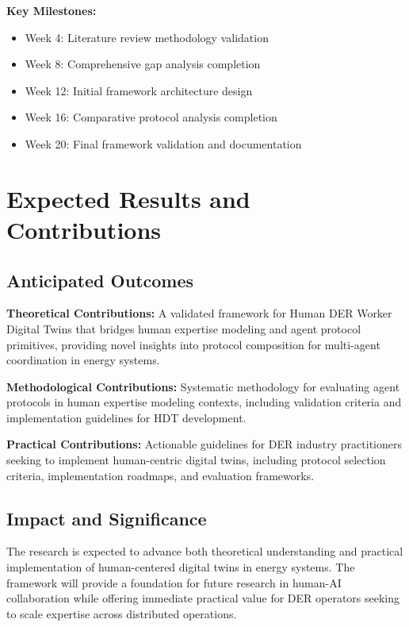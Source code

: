 \documentclass[12pt,a4paper]{article}
\begin{document}
\textbf{Key Milestones:}
\begin{itemize}
\item Week 4: Literature review methodology validation
\item Week 8: Comprehensive gap analysis completion
\item Week 12: Initial framework architecture design
\item Week 16: Comparative protocol analysis completion
\item Week 20: Final framework validation and documentation
\end{itemize}

\section{Expected Results and Contributions}
\label{sec:results}

\subsection{Anticipated Outcomes}

\textbf{Theoretical Contributions:} A validated framework for Human DER Worker Digital Twins that bridges human expertise modeling and agent protocol primitives, providing novel insights into protocol composition for multi-agent coordination in energy systems.

\textbf{Methodological Contributions:} Systematic methodology for evaluating agent protocols in human expertise modeling contexts, including validation criteria and implementation guidelines for HDT development.

\textbf{Practical Contributions:} Actionable guidelines for DER industry practitioners seeking to implement human-centric digital twins, including protocol selection criteria, implementation roadmaps, and evaluation frameworks.

\subsection{Impact and Significance}

The research is expected to advance both theoretical understanding and practical implementation of human-centered digital twins in energy systems. The framework will provide a foundation for future research in human-AI collaboration while offering immediate practical value for DER operators seeking to scale expertise across distributed operations.
\end{document}
